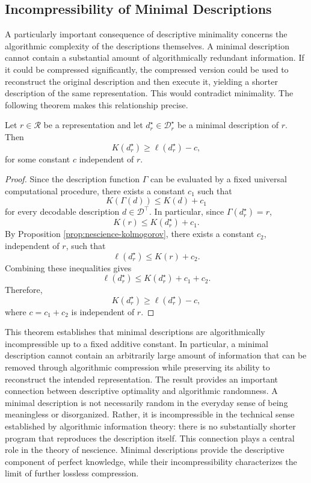 
\subsection*{Incompressibility of Minimal Descriptions}

A particularly important consequence of descriptive minimality concerns the algorithmic complexity of the descriptions themselves. A minimal description cannot contain a substantial amount of algorithmically redundant information. If it could be compressed significantly, the compressed version could be used to reconstruct the original description and then execute it, yielding a shorter description of the same representation. This would contradict minimality. The following theorem makes this relationship precise.

\begin{theorem}
\label{th:perfect_incompressible}
Let $r\in\mathcal{R}$ be a representation and let $d_r^\star\in\mathcal{D}_r^\star$ be a minimal description of $r$. Then
\[
K(d_r^\star) \geq \ell(d_r^\star)-c,
\]
for some constant $c$ independent of $r$.
\end{theorem}
\begin{proof}
Since the description function $\Gamma$ can be evaluated by a fixed universal computational procedure, there exists a constant $c_1$ such that
\[
K(\Gamma(d))\leq K(d)+c_1
\]
for every decodable description $d\in\mathcal{D}^\top$. In particular, since $\Gamma(d_r^\star)=r$,
\[
K(r)\leq K(d_r^\star)+c_1.
\]
By Proposition \ref{prop:nescience-kolmogorov}, there exists a constant $c_2$, independent of $r$, such that
\[
\ell(d_r^\star) \leq K(r)+c_2.
\]
Combining these inequalities gives
\[
\ell(d_r^\star) \leq K(d_r^\star)+c_1+c_2.
\]
Therefore,
\[
K(d_r^\star) \geq \ell(d_r^\star)-c,
\]
where $c=c_1+c_2$ is independent of $r$.
\end{proof}

This theorem establishes that minimal descriptions are algorithmically incompressible up to a fixed additive constant. In particular, a minimal description cannot contain an arbitrarily large amount of information that can be removed through algorithmic compression while preserving its ability to reconstruct the intended representation. The result provides an important connection between descriptive optimality and algorithmic randomness. A minimal description is not necessarily random in the everyday sense of being meaningless or disorganized. Rather, it is incompressible in the technical sense established by algorithmic information theory: there is no substantially shorter program that reproduces the description itself. This connection plays a central role in the theory of nescience. Minimal descriptions provide the descriptive component of perfect knowledge, while their incompressibility characterizes the limit of further lossless compression.

